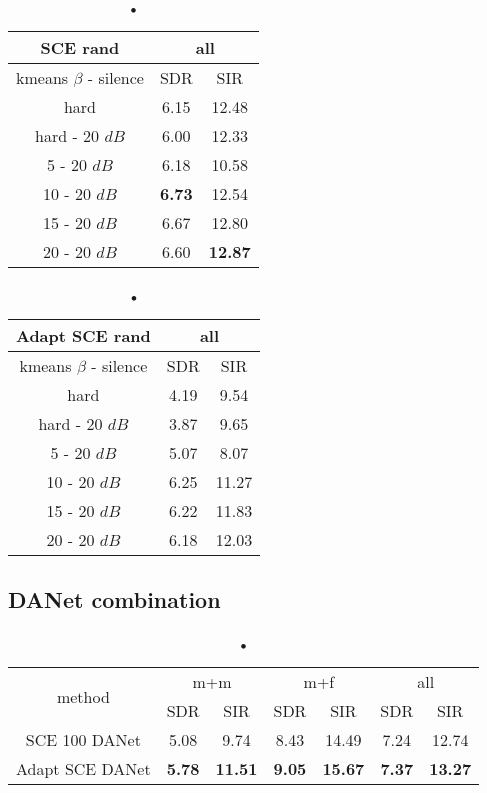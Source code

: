 \documentclass[master,final,11pt]{iscs-thesis}
\begin{document}
\begin{table}
\begin{subtable}{.5\linewidth}
\centering
\begin{tabular}{c|c|c}
SCE rand & \multicolumn{2}{c}{all} \\  
\hline 
kmeans $\beta$ - silence & SDR & SIR  \\ 
\hline
hard  & 6.15 & 12.48  \\ 
hard - 20 $dB$  & 6.00 & 12.33 \\
\hline
\hline
5 - 20 $dB$  & 6.18 & 10.58 \\ 
10 - 20 $dB$  & \cellcolor{green}\textbf{6.73} & \cellcolor{green}12.54 \\ 
15 - 20 $dB$ & 6.67 & 12.80  \\ 
20 - 20 $dB$ & 6.60 & \textbf{12.87}  \\ 
\end{tabular}
\caption{•}
\label{table:SCE100NSbest}
\end{subtable}%
\begin{subtable}{.5\linewidth}
\centering
\begin{tabular}{c|c|c}
Adapt SCE rand & \multicolumn{2}{c}{all} \\  
\hline 
kmeans $\beta$ - silence & SDR & SIR  \\ 
\hline
hard  & 4.19 & 9.54  \\ 
hard - 20 $dB$  & 3.87 & 9.65 \\
\hline
\hline
5 - 20 $dB$  & 5.07 & 8.07 \\ 
10 - 20 $dB$  & 6.25 & 11.27 \\ 
15 - 20 $dB$ & 6.22 & 11.83  \\ 
20 - 20 $dB$ & 6.18 & 12.03  \\ 
\end{tabular}
\caption{•}
\end{subtable}
\caption{•}
\end{table}


\subsection{DANet combination}
\label{DANET}

\begin{table}[h]
\centering
\begin{tabular}{c|c|c|c|c|c|c}
 \multirow{2}{*}{method}   & \multicolumn{2}{c|}{m+m} & \multicolumn{2}{c|}{m+f} & \multicolumn{2}{c}{all} \\ 
\cline{2-7}
 & SDR & SIR & SDR & SIR & SDR & SIR \\ 
\hline 
SCE 100 DANet & 5.08 & 9.74 & 8.43 & 14.49 & 7.24 & 12.74 \\ 
Adapt SCE DANet & \textbf{5.78} & \textbf{11.51} & \textbf{9.05} & \textbf{15.67} & \textbf{7.37} & \textbf{13.27} \\  
\end{tabular}
\captionsetup{justification=centering}
\caption{•}
\label{table:SCE100DANETrecap}
\end{table}
\end{document}

